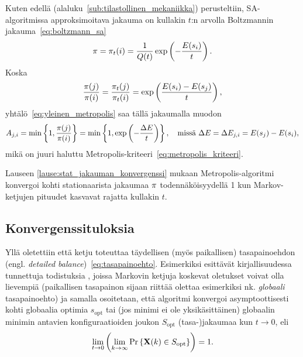 Kuten edellä (alaluku~\ref{sub:tilastollinen_mekaniikka}) perusteltiin, SA-algoritmissa approksimoitava jakauma \vect{\pi} on  kullakin $t$:n arvolla Boltzmannin jakauma~\ref{eq:boltzmann_sa}
\begin{equation}
    \mathbf{\pi} = \mathbf{\pi}_t(i) = \frac{1}{Q(t)} \exp \left(-\frac{E(s_i)}{t}\right).
\end{equation}
Koska
\begin{equation}
    \frac{\mathbf{\pi}(j)}{\mathbf{\pi}(i)} = \frac{\mathbf{\pi}_t(j)}{\mathbf{\pi}_t(i)} = \exp \left(\frac{E(s_i) - E(s_j)}{t}\right),
\end{equation}
yhtälö~\ref{eq:yleinen_metropolis} saa tällä jakaumalla muodon
\begin{equation}
    \label{eq:boltzmann_metropolis}
    A_{j,i} = \min\left\{1, \frac{\mathbf{\pi}(j)}{\mathbf{\pi}(i)}\right\} = \min\left\{1, \exp \left(-\frac{\Delta E}{t}\right)\right\}, \quad \text{missä } \Delta E = \Delta E_{j,i} = E(s_j) - E(s_i),
\end{equation}
mikä on juuri haluttu Metropolis-kriteeri~\ref{eq:metropolis_kriteeri}.

Lauseen  \ref{lause:stat_jakauman_konvergenssi} mukaan Metropolis-algoritmi konvergoi kohti stationaarista jakaumaa $\mathbf{\pi}$ todennäköisyydellä 1 kun Markov-ketjujen pituudet kasvavat rajatta kullakin $t$.

\subsection{Konvergenssituloksia}
\label{sub:Konvergenssituloksia}

Yllä oletettiin että ketju toteuttaa täydellisen (myös paikallisen) tasapainoehdon (engl. \emph{detailed balance})~\eqref{eq:tasapainoehto}.
Esimerkiksi \citeauthor{laarhoven} esittävät kirjallisuudessa tunnettuja todistuksia \cite[Luvut 3.1.2, 3.1.3]{laarhoven},
joissa Markovin ketjuja koskevat oletukset voivat olla lievempiä (paikallisen tasapainon sijaan riittää olettaa esimerkiksi nk. \emph{globaali} tasapainoehto)
ja samalla osoitetaan, että algoritmi konvergoi asymptoottisesti kohti globaalia optimia $s_\text{opt}$ tai (jos minimi ei ole yksikäsittäinen) globaalin minimin antavien konfiguraatioiden joukon $S_\text{opt}$ (tasa-)jakaumaa kun $t \to 0$,
eli
\begin{equation}
    \lim_{t \to 0} \left(\lim_{k \to \infty}\Pr\left\{\mathbf{X}(k) \in S_\text{opt}\right\} \right) = 1.
\end{equation}

